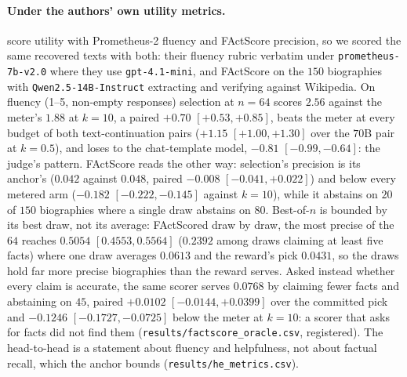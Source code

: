 \paragraph{Under the authors' own utility metrics.}\label{app:hemetrics}
\citet{he2026anchored} score utility with Prometheus-2 fluency and FActScore precision, so we scored the same
recovered texts with both: their fluency rubric verbatim under \texttt{prometheus-7b-v2.0}
\citep{kim2024prometheus2} where they use \texttt{gpt-4.1-mini}, and FActScore \citep{min2023factscore} on
the $150$ biographies with \texttt{Qwen2.5-14B-Instruct} extracting and verifying against Wikipedia. On
fluency (1--5, non-empty responses) selection at $n=64$ scores $2.56$ against the meter's $1.88$ at $k=10$, a
paired $+0.70$ $[+0.53, +0.85]$, beats the meter at every budget of both text-continuation pairs
($+1.15$ $[+1.00, +1.30]$ over the $70$B pair at $k=0.5$), and loses to the chat-template model,
$-0.81$ $[-0.99, -0.64]$: the judge's pattern. FActScore reads the other way: selection's precision is its
anchor's ($0.042$ against $0.048$, paired $-0.008$ $[-0.041, +0.022]$) and below every metered arm
($-0.182$ $[-0.222, -0.145]$ against $k=10$), while it abstains on $20$ of $150$ biographies where a single
draw abstains on $80$. Best-of-$n$ is bounded by its best draw, not its average: FActScored draw by draw,
the most precise of the $64$ reaches $0.5054$ $[0.4553, 0.5564]$ ($0.2392$ among draws claiming at least five
facts) where one draw averages $0.0613$ and the reward's pick $0.0431$, so the draws hold far more precise
biographies than the reward serves. Asked instead whether every claim is accurate, the same scorer serves $0.0768$ by claiming
fewer facts and abstaining on $45$, paired $+0.0102$ $[-0.0144, +0.0399]$ over the committed pick and
$-0.1246$ $[-0.1727, -0.0725]$ below the meter at $k=10$: a scorer that asks for facts did not find them
(\texttt{results/\allowbreak factscore\_\allowbreak oracle.csv}, registered). The head-to-head is a statement
about fluency and helpfulness, not about factual recall, which the anchor bounds
(\texttt{results/\allowbreak he\_\allowbreak metrics.csv}).

